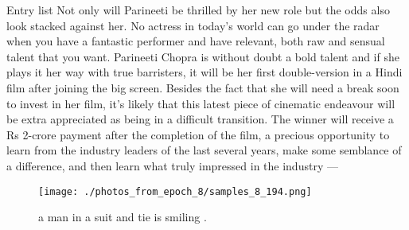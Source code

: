 \documentclass{article}%
\begin{document}
Entry list\newline%
Not only will Parineeti be thrilled by her new role but the odds also look stacked against her. No actress in today's world can go under the radar when you have a fantastic performer and have relevant, both raw and sensual talent that you want.\newline%
Parineeti Chopra is without doubt a bold talent and if she plays it her way with true barristers, it will be her first double{-}version in a Hindi film after joining the big screen. Besides the fact that she will need a break soon to invest in her film, it's likely that this latest piece of cinematic endeavour will be extra appreciated as being in a difficult transition.\newline%
The winner will receive a Rs 2{-}crore payment after the completion of the film, a precious opportunity to learn from the industry leaders of the last several years, make some semblance of a difference, and then learn what truly impressed in the industry —\newline%

%


\begin{figure}[h!]%
\centering%
\texttt{[image: ./photos\_from\_epoch\_8/samples\_8\_194.png]}%
\caption{a man in a suit and tie is smiling .}%
\end{figure}

%
\end{document}
